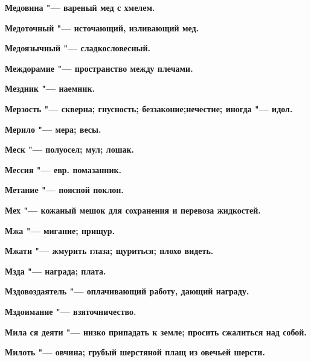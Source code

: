\begin{mymulticols}{2}
\bfseries Медовина\normalfont{} "--- вареный мед с хмелем. 




\bfseries Медоточный\normalfont{} "--- источающий, изливающий мед. 




\bfseries Медоязычный\normalfont{} "--- сладкословесный. 




\bfseries Междорамие\normalfont{} "--- пространство между плечами. 




\bfseries Мездник\normalfont{} "--- наемник. 




\bfseries Мерзость\normalfont{} "--- скверна; гнусность; беззаконие;нечестие; иногда "--- идол. 




\bfseries Мерило\normalfont{} "--- мера; весы. 




\bfseries Меск\normalfont{} "--- полуосел; мул; лошак. 




\bfseries Мессия\normalfont{} "--- евр. помазанник. 




\bfseries Метание\normalfont{} "--- поясной поклон. 




\bfseries Мех\normalfont{} "--- кожаный мешок для сохранения и перевоза жидкостей. 




\bfseries Мжа\normalfont{} "--- мигание; прищур. 




\bfseries Мжати\normalfont{} "--- жмурить глаза; щуриться; плохо видеть. 




\bfseries Мзда\normalfont{} "--- награда; плата. 




\bfseries Мздовоздаятель\normalfont{} "--- оплачивающий работу, дающий награду. 




\bfseries Мздоимание\normalfont{} "--- взяточничество. 




\bfseries Мила ся деяти\normalfont{} "--- низко припадать к земле; просить сжалиться над собой. 




\bfseries Милоть\normalfont{} "--- овчина; грубый шерстяной плащ из овечьей шерсти. 





\end{mymulticols}
